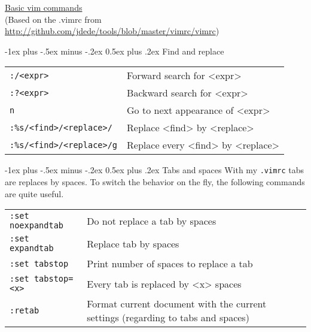 \documentclass[a4paper,10pt,landscape]{article}
\makeatletter
\renewcommand{\section}{\@startsection{section}{1}{0mm}%
                                {-1ex plus -.5ex minus -.2ex}%
                                {0.5ex plus .2ex}%
                                {\normalfont\large\bfseries}}
\makeatother
\begin{document}
\raggedright
\footnotesize
\begin{multicols}{3}


\setlength{\premulticols}{1pt}
\setlength{\postmulticols}{1pt}
\setlength{\multicolsep}{1pt}
\setlength{\columnsep}{2pt}

\begin{center}
     \Large{\underline{Basic vim commands}} \\
     {\tiny
         (Based on the .vimrc from \url{http://github.com/jdede/tools/blob/master/vimrc/vimrc})
     }
\end{center}

\section{Find and replace}
\tiny{
    \begin{tabularx}{\columnwidth}{|l|X|}
        \hline
        \texttt{:/<expr>}&Forward search for <expr>\\
        \texttt{:?<expr>}&Backward search for <expr>\\
        \texttt{n}&Go to next appearance of <expr>\\
        \hline
        \texttt{:\%s/<find>/<replace>/}&Replace <find> by <replace>\\
        \texttt{:\%s/<find>/<replace>/g}&Replace every <find> by <replace>\\
        \hline
    \end{tabularx}
}

\section{Tabs and spaces}
\tiny{With my \texttt{.vimrc} tabs are replaces by spaces. To switch the
behavior on the fly, the following commands are quite useful.}
\tiny{
    \begin{tabularx}{\columnwidth}{|l|X|}
        \hline
        \texttt{:set noexpandtab}&Do not replace a tab by spaces\\
        \texttt{:set expandtab}&Replace tab by spaces\\
        \hline
        \texttt{:set tabstop}&Print number of spaces to replace a tab\\
        \texttt{:set tabstop=<x>}&Every tab is replaced by <x> spaces\\
        \hline
        \texttt{:retab}&Format current document with the current settings
        (regarding to tabs and spaces)\\
        \hline
    \end{tabularx}
}


\end{multicols}
\end{document}
